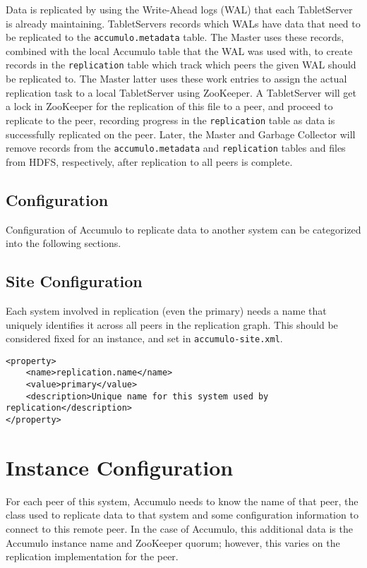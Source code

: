Data is replicated by using the Write-Ahead logs (WAL) that each TabletServer is
already maintaining. TabletServers records which WALs have data that need to be
replicated to the \texttt{accumulo.metadata} table. The Master uses these records,
combined with the local Accumulo table that the WAL was used with, to create records
in the \texttt{replication} table which track which peers the given WAL should be
replicated to. The Master latter uses these work entries to assign the actual
replication task to a local TabletServer using ZooKeeper. A TabletServer will get
a lock in ZooKeeper for the replication of this file to a peer, and proceed to
replicate to the peer, recording progress in the \texttt{replication} table as
data is successfully replicated on the peer. Later, the Master and Garbage Collector
will remove records from the \texttt{accumulo.metadata} and \texttt{replication} tables
and files from HDFS, respectively, after replication to all peers is complete.

\subsection{Configuration}

Configuration of Accumulo to replicate data to another system can be categorized
into the following sections.

\subsection{Site Configuration}

Each system involved in replication (even the primary) needs a name that uniquely
identifies it across all peers in the replication graph. This should be considered
fixed for an instance, and set in \texttt{accumulo-site.xml}.

\begingroup\fontsize{8pt}{8pt}\selectfont\begin{verbatim}
<property>
    <name>replication.name</name>
    <value>primary</value>
    <description>Unique name for this system used by replication</description>
</property>
\end{verbatim}\endgroup

\section{Instance Configuration}

For each peer of this system, Accumulo needs to know the name of that peer,
the class used to replicate data to that system and some configuration information
to connect to this remote peer. In the case of Accumulo, this additional data
is the Accumulo instance name and ZooKeeper quorum; however, this varies on the
replication implementation for the peer.

